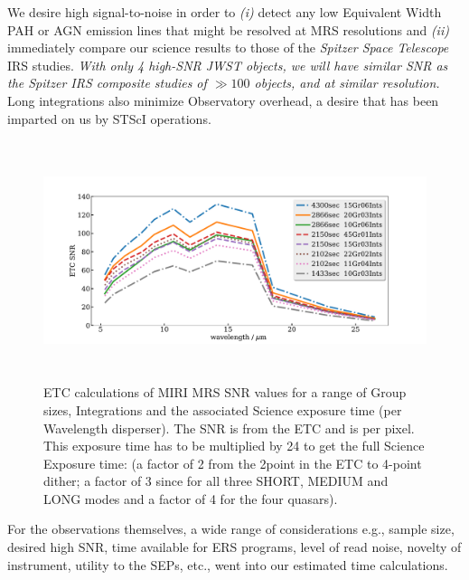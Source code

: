 \smallskip \smallskip
\noindent 
We desire high signal-to-noise in order to {\it(i)} detect any low
Equivalent Width PAH or AGN emission lines that might be resolved at
MRS resolutions and {\it(ii)} immediately compare our science results
to those of the {\it Spitzer Space Telescope} IRS studies.  {\it
With only 4 high-SNR JWST objects, we will have similar SNR as the
Spitzer IRS composite studies of $\gg100$ objects, and at similar
resolution.}  Long integrations also minimize Observatory overhead, a
desire that has been imparted on us by STScI operations.

\begin{figure}[h]
  \begin{center}
    \includegraphics[height=7.0cm,width=16.5cm]{../ETC_calcs/SNR_vs_wavelength_comparisons_full.pdf}
    \end{center}
    \vspace{-20pt}
    \caption{ETC calculations of MIRI MRS SNR values for a range of Group
      sizes, Integrations and the associated Science exposure time (per
      Wavelength disperser). The SNR is from the ETC and is per pixel. 
      This exposure time 
      has to be multiplied by 24 to get the full Science Exposure time:   
      (a factor of 2 from the 2point in the ETC to 4-point dither; 
      a factor of 3 since for all three SHORT, MEDIUM and LONG modes and 
      a factor of 4 for the four quasars). 
 }
    \label{fig:SNR_vs_wavelength}
  \end{figure}

\smallskip \smallskip
\noindent 
For the observations themselves, a wide range of considerations e.g.,
sample size, desired high SNR, time available for ERS programs, level
of read noise, novelty of instrument, utility to the SEPs, etc., went
into our estimated time calculations.

